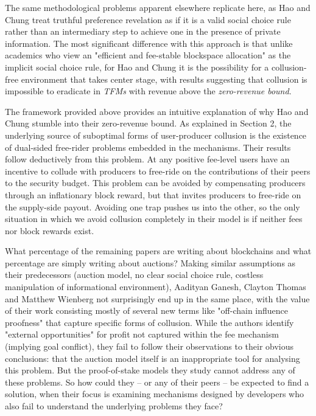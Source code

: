 The same methodological problems apparent elsewhere replicate here, as Hao and Chung treat truthful preference revelation as if it is a valid social choice rule rather than an intermediary step to achieve one in the presence of private information. The most significant difference with this approach is that unlike academics who view an "efficient and fee-stable blockspace allocation" as the implicit social choice rule, for Hao and Chung it is the possibility for a collusion-free environment that takes center stage, with results suggesting that collusion is impossible to eradicate in \textit{TFMs} with revenue above the \textit{zero-revenue bound}.

The framework provided above provides an intuitive explanation of why Hao and Chung stumble into their zero-revenue bound. As explained in Section 2, the underlying source of suboptimal forms of user-producer collusion is the existence of dual-sided free-rider problems embedded in the mechanisms. Their results follow deductively from this problem. At any positive fee-level users have an incentive to collude with producers to free-ride on the contributions of their peers to the security budget. This problem can be avoided by compensating producers through an inflationary block reward, but that invites producers to free-ride on the supply-side payout. Avoiding one trap pushes us into the other, so the only situation in which we avoid collusion completely in their model is if neither fees nor block rewards exist.



What percentage of the remaining papers are writing about blockchains and what percentage are simply writing about auctions? Making similar assumptions as their predecessors (auction model, no clear social choice rule, costless manipulation of informational environment), Aadityan Ganesh, Clayton Thomas and Matthew Wienberg not surprisingly end up in the same place, with the value of their work consisting mostly of several new terms like "off-chain influence proofness" that capture specific forms of collusion. While the authors identify "external opportunities" for profit not captured within the fee mechanism (implying goal conflict), they fail to follow their observations to their obvious conclusions: that the auction model itself is an inappropriate tool for analysing this problem. But the proof-of-stake models they study cannot address any of these problems. So how could they -- or any of their peers -- be expected to find a solution, when their focus is examining mechanisms designed by developers who also fail to understand the underlying problems they face?

